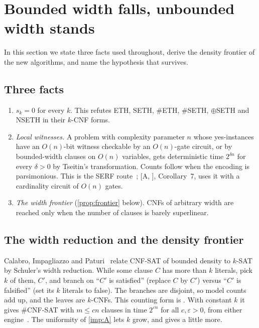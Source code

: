 \documentclass[10pt]{amsart}
\theoremstyle{plain}
\theoremstyle{definition}
\theoremstyle{remark}
\numberwithin{equation}{section}
\newcommand{\A}[1][]{\textup{[A\if\relax\detokenize{#1}\relax\else, #1\fi]}}
\begin{document}
\section{Bounded width falls, unbounded width stands}\label{sec:width}

In this section we state three facts used throughout, derive the density frontier of the new
algorithms, and name the hypothesis that survives.

\subsection{Three facts}
\begin{enumerate}[label=\textup{(F\arabic*)}]
\item\label{F1} $s_k=0$ for every $k$. This refutes ETH, SETH, $\#$ETH, $\#$SETH, $\oplus$SETH and
NSETH in their $k$-CNF forms.
\item\label{F2} \emph{Local witnesses.} A problem with complexity parameter $n$ whose yes-instances
have an $O(n)$-bit witness checkable by an $O(n)$-gate circuit, or by bounded-width clauses on
$O(n)$ variables, gets deterministic time $2^{\delta n}$ for every $\delta>0$ by Tseitin's
transformation. Counts follow when the encoding is parsimonious. This is the SERF
route~\cite{IPZ01}; \A, Corollary~7, uses it with a cardinality circuit of $O(n)$ gates.
\item\label{F3} \emph{The width frontier} (\cref{prop:frontier} below). CNFs of arbitrary width are
reached only when the number of clauses is barely superlinear.
\end{enumerate}

\subsection{The width reduction and the density frontier}
Calabro, Impagliazzo and Paturi~\cite{CIP06} relate CNF-SAT of bounded density to $k$-SAT by
Schuler's width reduction. While some clause $C$ has more than $k$ literals, pick $k$ of them,
$C'$, and branch on ``$C'$ is satisfied'' (replace $C$ by $C'$) versus ``$C'$ is falsified'' (set
its $k$ literals to false). The branches are disjoint, so model counts add up, and the leaves are
$k$-CNFs. This counting form is \cite[Lemma~6.1]{TulsyanQ26}. With constant $k$ it gives
$\#$CNF-SAT with $m\le cn$ clauses in time $2^{\varepsilon n}$ for all $c,\varepsilon>0$, from
either engine~\cite[Corollary~6.2]{TulsyanQ26}. The uniformity of \cref{imp:A} lets $k$ grow, and
gives a little more.
\end{document}
